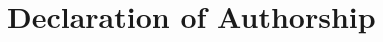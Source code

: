 \chapter*{Declaration of Authorship}

\setlength{\parindent}{0pt}
\setlength{\parskip}{0.5\baselineskip}


